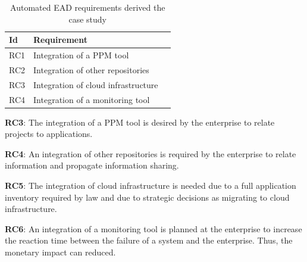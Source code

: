 \begin{table}[htpb]
  \caption[Automated EAD requirements derived from the case study]{Automated EAD requirements derived the case study}\label{tab:sample}
  \centering
  \begin{tabular}{l l l}
    \toprule
      Id & Requirement\\
    \midrule
      RC1 & Integration of a PPM tool\\
      RC2 & Integration of other repositories\\
      RC3 & Integration of cloud infrastructure\\
      RC4 & Integration of a monitoring tool\\
    \bottomrule
  \end{tabular}
\end{table}



\textbf{RC3}: The integration of a PPM tool is desired by the enterprise to relate projects to applications.

\textbf{RC4}: An integration of other repositories is required by the enterprise to relate information and propagate information sharing.

\textbf{RC5}: The integration of cloud infrastructure is needed due to a full application inventory required by law and due to strategic decisions as migrating to cloud infrastructure.

\textbf{RC6}: An integration of a monitoring tool is planned at the enterprise to increase the reaction time between the failure of a system and the enterprise. Thus, the monetary impact can reduced.


